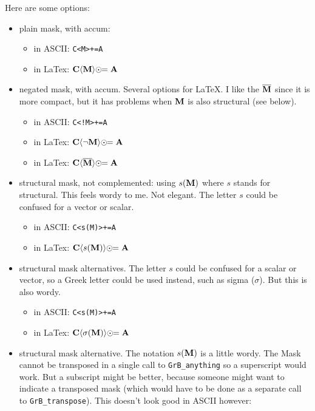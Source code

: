 \documentclass[11pt]{article}
\begin{document}
Here are some options:

\begin{itemize}
\item plain mask, with accum:

    \begin{itemize}
    \item[] in ASCII: \verb'C<M>+=A'
    \item[] in LaTex: $\bf C \langle M \rangle \odot\!\!= A $
    \end{itemize}

\item negated mask, with accum.  Several options for LaTeX.
I like the $\overline{\bf M}$ since it is more compact, but it
has problems when $\bf M$ is also structural (see below).

    \begin{itemize}
    \item[] in ASCII: \verb'C<!M>+=A'
    \item[] in LaTex: $\bf C \langle \neg M \rangle \odot\!\!= A$
    \item[] in LaTex:  $\bf C \langle \overline{M} \rangle \odot\!\!= A$
    \end{itemize}

\item structural mask, not complemented:
using $s({\bf M})$ where $s$ stands for structural.
This feels wordy to me.  Not elegant.
The letter $s$ could be confused for a vector or scalar.

    \begin{itemize}
    \item[] in ASCII: \verb'C<s(M)>+=A'
    \item[] in LaTex:  ${\bf C} \langle s({\bf M}) \rangle \odot\!\!= {\bf A}$
    \end{itemize}

\item structural mask alternatives.  The letter $s$ could be confused
for a scalar or vector, so a Greek letter could be used instead,
such as sigma ($\sigma$).  But this is also wordy.

    \begin{itemize}
    \item[] in ASCII: \verb'C<s(M)>+=A'
    \item[] in LaTex:  ${\bf C} \langle \sigma({\bf M}) \rangle \odot\!\!= {\bf A}$
    \end{itemize}

\item structural mask alternative.  The notation 
$s({\bf M})$ is a little wordy.  The Mask cannot be transposed in a
single call to \verb'GrB_anything' so a superscript would work.  But a
subscript might be better, because someone might want to indicate a
transposed mask (which would have to be done as a separate call to
\verb'GrB_transpose').  This doesn't look good in ASCII however:


\end{itemize}
\end{document}

